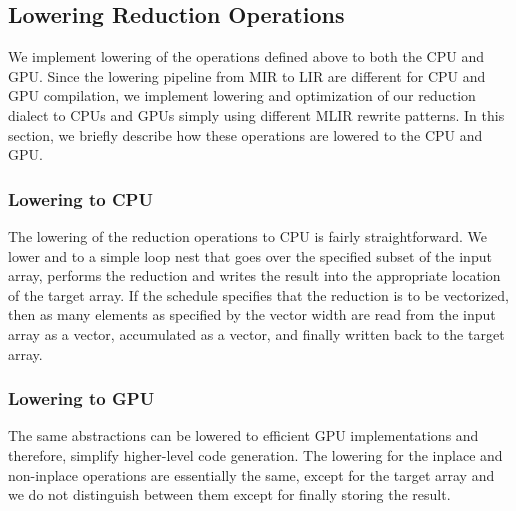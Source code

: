   

\subsection{Lowering Reduction Operations}
We implement lowering of the operations defined above to both the CPU and GPU.
Since the lowering pipeline from MIR to LIR are different for CPU and GPU 
compilation, we implement lowering and optimization of our reduction dialect to CPUs and
GPUs simply using different MLIR rewrite patterns. In this section, we briefly describe 
how these operations are lowered to the CPU and GPU. 

\subsubsection{Lowering to CPU}
The lowering of the reduction operations to CPU is fairly straightforward. We lower 
 and 
 to a simple loop nest that goes over the specified
subset of the input array, performs the reduction and writes 
the result into the appropriate location of the target array. 
If the schedule specifies that the reduction is to be vectorized,
then as many elements as specified by the vector width are read 
from the input array as a vector, accumulated as a vector, and 
finally written back to the target array.



\subsubsection{Lowering to GPU}
The same abstractions can be lowered to efficient GPU implementations
and therefore, simplify higher-level code generation. The lowering for 
the inplace and non-inplace operations are essentially the same, except 
for the target array and we do not distinguish between them except 
for finally storing the result. 

